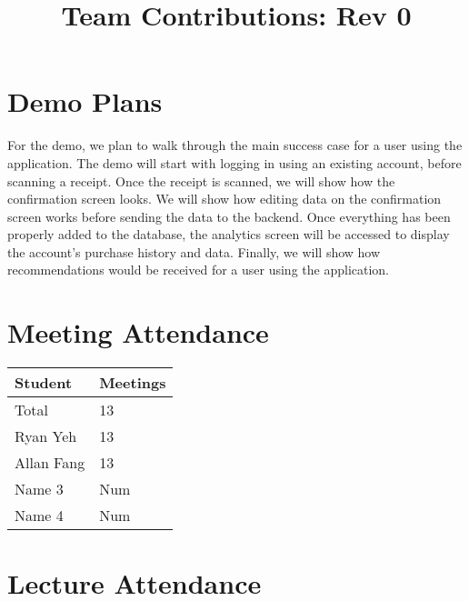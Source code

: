 \documentclass{article}
\title{Team Contributions: Rev 0\\\progname}
\author{\authname}
\date{}
\begin{document}
\maketitle

\section{Demo Plans}

For the demo, we plan to walk through the main success case for a user using the application.
The demo will start with logging in using an existing account, before scanning a receipt. Once
the receipt is scanned, we will show how the confirmation screen looks. We will show how editing
data on the confirmation screen works before sending the data to the backend. Once everything has
been properly added to the database, the analytics screen will be accessed to display the account's
purchase history and data. Finally, we will show how recommendations would be received for a user
using the application.

\section{Meeting Attendance}


\begin{table}[H]
\centering
\begin{tabular}{ll}
\toprule
\textbf{Student} & \textbf{Meetings}\\
\midrule
Total & 13\\
Ryan Yeh & 13\\
Allan Fang & 13\\
Name 3 & Num\\
Name 4 & Num\\
\bottomrule
\end{tabular}
\end{table}


\section{Lecture Attendance}
\end{document}
